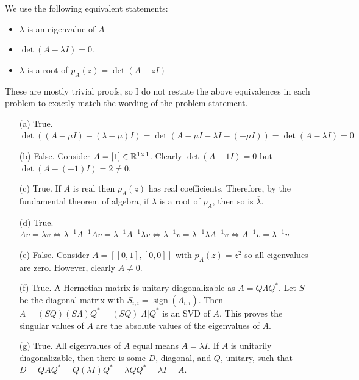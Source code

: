 \documentclass[10pt]{article}
\begin{document}
\begin{solution}[Solution]
We use the following equivalent statements:
\begin{itemize}[nolistsep]
    \item \( \lambda \) is an eigenvalue of \( A \) 
    \item \( \det(A-\lambda I) = 0 \).
    \item \( \lambda \) is a root of \( p_A(z) = \det(A-zI) \)
\end{itemize}

These are mostly trivial proofs, so I do not restate the above equivalences in each problem to exactly match the wording of the problem statement.

\begin{enumerate}
    \item[(a)] True. 
        \( \operatorname{det}((A-\mu I)-(\lambda-\mu)I) = \operatorname{det}(A-\mu I - \lambda I -(-\mu I)) = \operatorname{det}( A-\lambda I ) = 0 \) %
    \item[(b)] False. Consider \( A=[1]\in\mathbb{R}^{1\times 1} \). Clearly \( \det(A-1 I) = 0 \) but \( \det(A-(-1)I) = 2 \neq 0 \).
    \item[(c)] True. If \( A \) is real then \( p_A(z) \) has real coefficients. Therefore, by the fundamental theorem of algebra, if \( \lambda \) is a root of \( p_A \), then so is \( \overline{\lambda} \).
    \item[(d)] True. \( Av = \lambda v \Longleftrightarrow  \lambda^{-1}A^{-1}Av = \lambda^{-1}A^{-1} \lambda v \Longleftrightarrow \lambda^{-1}v = \lambda^{-1}\lambda A^{-1} v \Longleftrightarrow A^{-1} v = \lambda^{-1}v \) 
    \item[(e)] False. Consider \( A=[[0,1],[0,0]] \) with \( p_A(z) = z^2 \) so all eigenvalues are zero. However, clearly \( A\neq 0 \). 
    \item[(f)] True. A Hermetian matrix is unitary diagonalizable as \( A=Q\Lambda Q^* \). Let \( S \) be the diagonal matrix with \( S_{i,i} = \operatorname{sign}(\Lambda_{i,i}) \). Then \( A= (SQ) (S\Lambda) Q^* = (SQ)|\Lambda|Q^* \) is an SVD of \( A \). This proves the singular values of \( A \) are the absolute values of the eigenvalues of \( A \).
    \item[(g)] True. All eigenvalues of \( A \) equal means \( A=\lambda I \). If \( A \) is unitarily diagonalizable, then there is some \( D \), diagonal, and \( Q \), unitary, such that \( D=QAQ^*  = Q(\lambda I)Q^* = \lambda QQ^* = \lambda I = A \).  
\end{enumerate}

\end{solution}
\end{document}
